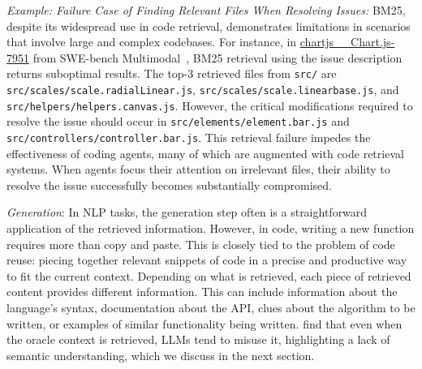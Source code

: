 \begin{tcolorbox}[colback=lightblue, boxrule=0pt, arc=5pt, outer arc=5pt, after skip=10pt plus 2pt]
\textit{Example: Failure Case of Finding Relevant Files When Resolving Issues:} BM25, despite its widespread use in code retrieval, demonstrates limitations in scenarios that involve large and complex codebases. For instance, in \href{https://github.com/chartjs/Chart.js/pull/7951}{chartjs\_\_Chart.js-7951} from SWE-bench Multimodal~\citep{yang2024swe}, BM25 retrieval using the issue description returns suboptimal results. The top-3 retrieved files from \texttt{src/} are \texttt{src/scales/scale.radialLinear.js}, \texttt{src/scales/scale.linearbase.js}, and \texttt{src/helpers/helpers.canvas.js}. However, the critical modifications required to resolve the issue should occur in \texttt{src/elements/element.bar.js} and \texttt{src/controllers/controller.bar.js}. This retrieval failure impedes the effectiveness of coding agents, many of which are augmented with code retrieval systems. When agents focus their attention on irrelevant files, their ability to resolve the issue successfully becomes substantially compromised.
\end{tcolorbox}

\textit{Generation}: 
In NLP tasks, the generation step often is a straightforward application of the retrieved information. However, in code, writing a new function requires more than copy and paste. This is closely tied to the problem of code reuse: piecing together relevant snippets of code in a precise and productive way to fit the current context. Depending on what is retrieved, each piece of retrieved content provides different information. This can include information about the language's syntax, documentation about the API, clues about the algorithm to be written, or examples of similar functionality being written. \citet{ding2023crosscodeeval} find that even when the oracle context is retrieved, LLMs tend to misuse it, highlighting a lack of semantic understanding, which we discuss in the next section.

